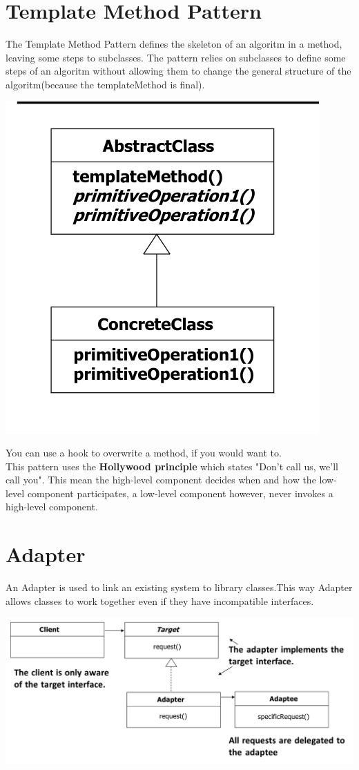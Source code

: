 \documentclass{report}
\begin{document}
   	\chapter{Template Method Pattern}
   		The Template Method Pattern defines the skeleton of an algoritm in a method, leaving some steps to subclasses. The pattern relies on subclasses to define some steps of an algoritm without allowing them to change the general structure of the algoritm(because the templateMethod is final). 
   		\begin{center}
   			\includegraphics[scale=0.6]{template_method}
   		\end{center} 
   		You can use a hook to overwrite a method, if you would want to. 
   		\\
   		This pattern uses the \textbf{Hollywood principle} which states "Don't call us, we'll call you". This mean the high-level component decides when and how the low-level component participates, a low-level component however, never invokes a high-level component.
	\chapter{Adapter}
		An Adapter is used to link an existing system to library classes.This way Adapter allows classes to work together even if they have incompatible interfaces.
		\begin{center}
			\includegraphics[scale=0.3]{adapter}
		\end{center}
\end{document}
